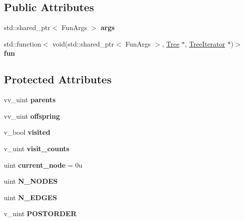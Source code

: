 \subsection*{Public Attributes}
\begin{DoxyCompactItemize}
\item 
std\+::shared\+\_\+ptr$<$ Fun\+Args $>$ {\bfseries args}\hypertarget{classpruner_1_1Tree_ac205a6f18c76016b2c526e62ed986d24}{}\label{classpruner_1_1Tree_ac205a6f18c76016b2c526e62ed986d24}

\item 
std\+::function$<$ void(std\+::shared\+\_\+ptr$<$ Fun\+Args $>$, \hyperlink{classpruner_1_1Tree}{Tree} $\ast$, \hyperlink{classpruner_1_1TreeIterator}{Tree\+Iterator} $\ast$)$>$ {\bfseries fun}\hypertarget{classpruner_1_1Tree_a6a54846f5e95a7d07369e4075ff651a7}{}\label{classpruner_1_1Tree_a6a54846f5e95a7d07369e4075ff651a7}

\end{DoxyCompactItemize}
\subsection*{Protected Attributes}
\begin{DoxyCompactItemize}
\item 
vv\+\_\+uint {\bfseries parents}\hypertarget{classpruner_1_1Tree_a9911227c95222495556b75e0bb93d255}{}\label{classpruner_1_1Tree_a9911227c95222495556b75e0bb93d255}

\item 
vv\+\_\+uint {\bfseries offspring}\hypertarget{classpruner_1_1Tree_a4681c11147392e23d9a09b247700bc85}{}\label{classpruner_1_1Tree_a4681c11147392e23d9a09b247700bc85}

\item 
v\+\_\+bool {\bfseries visited}\hypertarget{classpruner_1_1Tree_a2a8b91180af3a3af45364b10647c0fca}{}\label{classpruner_1_1Tree_a2a8b91180af3a3af45364b10647c0fca}

\item 
v\+\_\+uint {\bfseries visit\+\_\+counts}\hypertarget{classpruner_1_1Tree_a883d95ef62e679309e80e167ed02a96e}{}\label{classpruner_1_1Tree_a883d95ef62e679309e80e167ed02a96e}

\item 
uint {\bfseries current\+\_\+node} = 0u\hypertarget{classpruner_1_1Tree_a4d66035f145c9f9e9bdbd4a365ad8761}{}\label{classpruner_1_1Tree_a4d66035f145c9f9e9bdbd4a365ad8761}

\item 
uint {\bfseries N\+\_\+\+N\+O\+D\+ES}\hypertarget{classpruner_1_1Tree_a1f9cc9d18f9a4c06a32c5bf127f21027}{}\label{classpruner_1_1Tree_a1f9cc9d18f9a4c06a32c5bf127f21027}

\item 
uint {\bfseries N\+\_\+\+E\+D\+G\+ES}\hypertarget{classpruner_1_1Tree_af3e29b31a9fd7e634df390462a44ef19}{}\label{classpruner_1_1Tree_af3e29b31a9fd7e634df390462a44ef19}

\item 
v\+\_\+uint {\bfseries P\+O\+S\+T\+O\+R\+D\+ER}\hypertarget{classpruner_1_1Tree_a547937e845fdbceafae4db25cd74f880}{}\label{classpruner_1_1Tree_a547937e845fdbceafae4db25cd74f880}

\end{DoxyCompactItemize}

